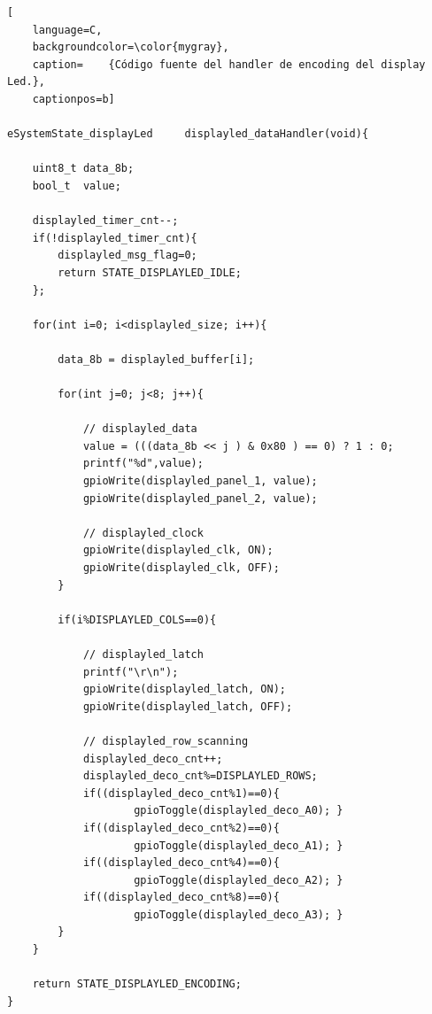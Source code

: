 \begin{lstlisting}[
	language=C, 
	backgroundcolor=\color{mygray},
	caption=	{Código fuente del handler de encoding del display Led.},
	captionpos=b]
	
eSystemState_displayLed     displayled_dataHandler(void){

    uint8_t data_8b;
    bool_t  value;

    displayled_timer_cnt--;
    if(!displayled_timer_cnt){
        displayled_msg_flag=0;
        return STATE_DISPLAYLED_IDLE;
    };    

    for(int i=0; i<displayled_size; i++){
        
        data_8b = displayled_buffer[i];
        
        for(int j=0; j<8; j++){
            
            // displayled_data 
            value = (((data_8b << j ) & 0x80 ) == 0) ? 1 : 0;
            printf("%d",value);
            gpioWrite(displayled_panel_1, value);
            gpioWrite(displayled_panel_2, value);
            
            // displayled_clock 
            gpioWrite(displayled_clk, ON);
            gpioWrite(displayled_clk, OFF);
        }
        
        if(i%DISPLAYLED_COLS==0){

            // displayled_latch 
            printf("\r\n");
            gpioWrite(displayled_latch, ON);
            gpioWrite(displayled_latch, OFF);
            
            // displayled_row_scanning
            displayled_deco_cnt++;
            displayled_deco_cnt%=DISPLAYLED_ROWS;
            if((displayled_deco_cnt%1)==0){ 
            		gpioToggle(displayled_deco_A0); }
            if((displayled_deco_cnt%2)==0){ 
            		gpioToggle(displayled_deco_A1); }
            if((displayled_deco_cnt%4)==0){ 
            		gpioToggle(displayled_deco_A2); }
            if((displayled_deco_cnt%8)==0){ 
            		gpioToggle(displayled_deco_A3); }
        }
    }
    
    return STATE_DISPLAYLED_ENCODING;
}

\end{lstlisting}
